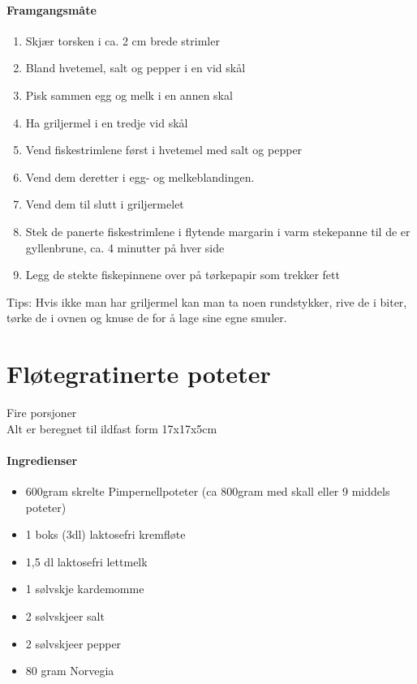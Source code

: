 \documentclass[12pt,a4paper]{book}
\begin{document}
\paragraph{Framgangsmåte}
\begin{enumerate}[noitemsep]
	\item Skjær torsken i ca. 2 cm brede strimler
	\item Bland hvetemel, salt og pepper i en vid skål
	\item Pisk sammen egg og melk i en annen skal
	\item Ha griljermel i en tredje vid skål
	\item Vend fiskestrimlene først i hvetemel med salt og pepper
	\item Vend dem deretter i egg- og melkeblandingen.
	\item Vend dem til slutt i griljermelet
	\item Stek de panerte fiskestrimlene i flytende margarin i varm stekepanne til de er gyllenbrune, ca. 4 minutter på hver side
	\item Legg de stekte fiskepinnene over på tørkepapir som trekker fett
\end{enumerate}

Tips: Hvis ikke man har griljermel kan man ta noen rundstykker, rive de i biter, tørke de i ovnen og knuse de for å lage sine egne smuler.
\clearpage{}
\clearpage{}\section{﻿Fløtegratinerte poteter}
\label{flotegratinerte}
Fire porsjoner\\
Alt er beregnet til ildfast form 17x17x5cm

\paragraph{Ingredienser}
\begin{itemize}[noitemsep]
	\item 600gram skrelte Pimpernellpoteter (ca 800gram med skall eller 9 middels poteter)
	\item	1 boks (3dl) laktosefri kremfløte
	\item 1,5 dl laktosefri lettmelk
	\item 1 sølvskje kardemomme
	\item 2 sølvskjeer salt
	\item 2 sølvskjeer pepper
	\item 80 gram Norvegia
\end{itemize}
\end{document}
